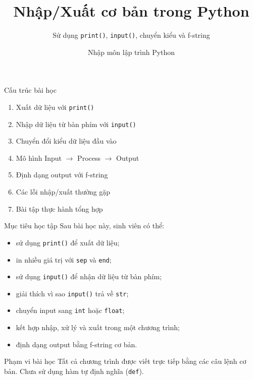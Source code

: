 \documentclass[aspectratio=169,10pt]{beamer}
\title[Nhập/Xuất cơ bản]{Nhập/Xuất cơ bản trong Python}
\subtitle{Sử dụng \texttt{print()}, \texttt{input()}, chuyển kiểu và f-string}
\author{Nhập môn lập trình Python}
\date{}
\begin{document}
\begin{frame}
  \titlepage
\end{frame}

\begin{frame}{Cấu trúc bài học}
\begin{enumerate}
  \item Xuất dữ liệu với \texttt{print()}
  \item Nhập dữ liệu từ bàn phím với \texttt{input()}
  \item Chuyển đổi kiểu dữ liệu đầu vào
  \item Mô hình Input $\rightarrow$ Process $\rightarrow$ Output
  \item Định dạng output với f-string
  \item Các lỗi nhập/xuất thường gặp
  \item Bài tập thực hành tổng hợp
\end{enumerate}
\end{frame}

\begin{frame}{Mục tiêu học tập}
Sau bài học này, sinh viên có thể:
\begin{itemize}
  \item sử dụng \texttt{print()} để xuất dữ liệu;
  \item in nhiều giá trị với \texttt{sep} và \texttt{end};
  \item sử dụng \texttt{input()} để nhận dữ liệu từ bàn phím;
  \item giải thích vì sao \texttt{input()} trả về \texttt{str};
  \item chuyển input sang \texttt{int} hoặc \texttt{float};
  \item kết hợp nhập, xử lý và xuất trong một chương trình;
  \item định dạng output bằng f-string cơ bản.
\end{itemize}
\begin{alertblock}{Phạm vi bài học}
Tất cả chương trình được viết trực tiếp bằng các câu lệnh cơ bản. Chưa sử dụng hàm tự định nghĩa (\texttt{def}).
\end{alertblock}
\end{frame}
\end{document}
